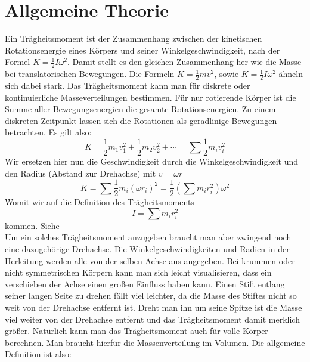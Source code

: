 \documentclass{article}
\begin{document}
	\section{Allgemeine Theorie}\label{Allgemeine_Theorie}
		Ein Trägheitsmoment ist der Zusammenhang zwischen der kinetischen Rotationsenergie eines Körpers und seiner Winkelgeschwindigkeit, nach der Formel \(K = \frac{1}{2}I \omega^2\).
		Damit stellt es den gleichen Zusammenhang her wie die Masse bei translatorischen Bewegungen. %
		Die Formeln \(K = \frac{1}{2} m v^2\), sowie \(K = \frac{1}{2} I \omega^2 \) ähneln sich dabei stark.
		Das Trägheitsmoment kann man für diskrete oder kontinuierliche Masseverteilungen bestimmen.
		Für nur rotierende Körper ist die Summe aller Bewegungsenergien die gesamte Rotationsenergien. Zu einem diskreten Zeitpunkt lassen sich die Rotationen als geradlinige Bewegungen betrachten. Es gilt also:
		\begin{equation}
			K = \frac{1}{2} m_1 v_1^2 + \frac{1}{2} m_2 v_2^2 + \cdots = \sum \frac{1}{2} m_i v_i^2
		\end{equation}
		Wir ersetzen hier nun die Geschwindigkeit durch die Winkelgeschwindigkeit und den Radius (Abstand zur Drehachse) mit \(v = \omega r\)
		\begin{equation}
			K = \sum \frac{1}{2} m_i {\left( \omega r_i \right)}^2 = \frac{1}{2} \left( \sum m_i r_i^2 \right) \omega^2
		\end{equation} 
		Womit wir auf die Definition des Trägheitsmoments
		\begin{equation}\label{eq:trägheitsmoment_diskret}
			I = \sum m_i r_i^2
		\end{equation} kommen. Siehe~\cite{HallidayPhysik} \\
		Um ein solches Trägheitsmoment anzugeben braucht man aber zwingend noch eine dazugehörige Drehachse.
		Die Winkelgeschwindigkeiten und Radien in der Herleitung werden alle von der selben Achse aus angegeben.
		Bei krummen oder nicht symmetrischen Körpern kann man sich leicht visualisieren, dass ein verschieben der Achse einen großen Einfluss haben kann.
		Einen Stift entlang seiner langen Seite zu drehen fällt viel leichter, da die Masse des Stiftes nicht so weit von der Drehachse entfernt ist.
		Dreht man ihn um seine Spitze ist die Masse viel weiter von der Drehachse entfernt und das Trägheitsmoment damit merklich größer. %
		Natürlich kann man das Trägheitsmoment auch für volle Körper berechnen. Man braucht hierfür die Massenverteilung im Volumen. Die allgemeine Definition ist also:
\end{document}
